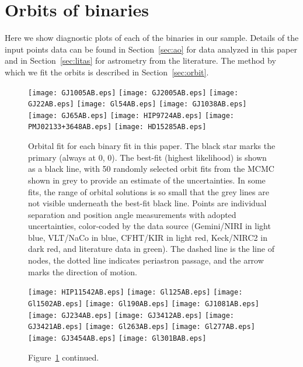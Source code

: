 \documentclass[twocolumn]{aastex62}
\begin{document}
\clearpage

\section{Orbits of binaries}\label{sec:orbitplots}

Here we show diagnostic plots of each of the binaries in our sample. Details of the input points data can be found in Section~\ref{sec:ao} for data analyzed in this paper and in Section~\ref{sec:litas} for astrometry from the literature. The method by which we fit the orbits is described in Section~\ref{sec:orbit}.

\begin{figure}[htp]
\begin{center}
\texttt{[image: GJ1005AB.eps]}
\texttt{[image: GJ2005AB.eps]}
\texttt{[image: GJ22AB.eps]}
\texttt{[image: Gl54AB.eps]}
\texttt{[image: GJ1038AB.eps]}
\texttt{[image: GJ65AB.eps]}
\texttt{[image: HIP9724AB.eps]} %
\texttt{[image: PMJ02133+3648AB.eps]} 
\texttt{[image: HD15285AB.eps]} %
\caption{Orbital fit for each binary fit in this paper. The black star marks the primary (always at 0, 0). The best-fit (highest likelihood) is shown as a black line, with 50 randomly selected orbit fits from the MCMC shown in grey to provide an estimate of the uncertainties. In some fits, the range of orbital solutions is so small that the grey lines are not visible underneath the best-fit black line. Points are individual separation and position angle measurements with adopted uncertainties, color-coded by the data source (Gemini/NIRI in light blue, VLT/NaCo in blue, CFHT/KIR in light red, Keck/NIRC2 in dark red, and literature data in green). The dashed line is the line of nodes, the dotted line indicates periastron passage, and the arrow marks the direction of motion. }
\label{fig:orbits1}
\end{center}
\end{figure}

\begin{figure}[htp]
\begin{center}
\texttt{[image: HIP11542AB.eps]} %
\texttt{[image: Gl125AB.eps]}
\texttt{[image: Gl1502AB.eps]}
\texttt{[image: Gl190AB.eps]}
\texttt{[image: GJ1081AB.eps]}
\texttt{[image: GJ234AB.eps]}
\texttt{[image: GJ3412AB.eps]}
\texttt{[image: GJ3421AB.eps]}
\texttt{[image: Gl263AB.eps]}
\texttt{[image: Gl277AB.eps]}
\texttt{[image: GJ3454AB.eps]}
\texttt{[image: Gl301BAB.eps]}
\caption{Figure~\ref{fig:orbits1} continued.}
\label{fig:orbits2}
\end{center}
\end{figure}
\end{document}
